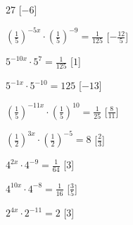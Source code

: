 \begin{esercizio}
\begin{enumeratea}
27\)
   \hfill [\(-6\)]
  \item  \(\left(\frac{1}{5}\right)^{-5x} \cdot \left(\frac{1}{5}\right)^{-9} = 
\frac{1}{125}\)
   \hfill [\(-\frac{12}{5}\)]
  \item  \(5^{-10x} \cdot 5^{7} = \frac{1}{125}\)
   \hfill [\(1\)]
  \item  \(5^{-1x} \cdot 5^{-10} = 125\)
   \hfill [\(-13\)]
  \item  \(\left(\frac{1}{5}\right)^{-11x} \cdot \left(\frac{1}{5}\right)^{10} = 
\frac{1}{25}\)
   \hfill [\(\frac{8}{11}\)]
  \item  \(\left(\frac{1}{2}\right)^{3x} \cdot \left(\frac{1}{2}\right)^{-5} = 
8\)
   \hfill [\(\frac{2}{3}\)]
  \item  \(4^{2x} \cdot 4^{-9} = \frac{1}{64}\)
   \hfill [\(3\)]
  \item  \(4^{10x} \cdot 4^{-8} = \frac{1}{16}\)
   \hfill [\(\frac{3}{5}\)]
  \item  \(2^{4x} \cdot 2^{-11} = 2\)
   \hfill [\(3\)]
 \end{enumeratea}
\end{esercizio}

